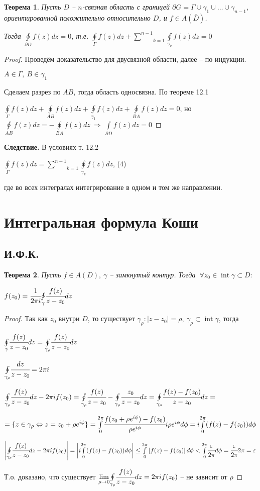 \documentclass[draft]{article}
\newcommand{\dd}{\partial}
\newcommand{\then}{\ \Rightarrow\ }
\newcommand{\mint}[2]{\underset{#1}{\overset{#2}{\int}}}
\newcommand{\moint}[1]{\underset{#1}{\oint}}
\newcommand{\msum}[2]{\underset{#1}{\overset{#2}{\sum}}}
\newcommand{\mlim}[1]{\underset{#1}{\lim}}
\newcommand{\LRA}{\Leftrightarrow}
\renewcommand{\bar}{\overline}
\newcommand{\Int}{\mathop{\mathrm{int}}\nolimits}
\newcommand{\g}{\gamma}
\newcommand{\G}{\Gamma}
\renewcommand{\f}{\phi}
\newcommand{\F}{\ \forall}
\newtheorem*{theor}{Теорема}
\theoremstyle{remark}
\begin{document}
\begin{theor}
Пусть $D$ -- $n$-связная область с границей $\dd G=\G\cup\g_1\cup\ldots\cup\g_{n-1}$, ориентированной положительно относительно $D$, и $f\in A(\bar{D})$. 

Тогда $\moint{\dd D}f(z)dz=0$, т.е. $\moint{\G}f(z)dz+\msum{k=1}{n-1}\moint{\g_k}f(z)dz=0$
\end{theor}
\begin{proof}
Проведём доказательство для двусвязной области, далее -- по индукции.

$A\in\G,\ B\in\g_1$

Сделаем разрез по $AB$, тогда область односвязна. По теореме 12.1

$\moint{\G}f(z)dz+\moint{AB}f(z)dz+\moint{\g_1}f(z)dz+\moint{BA}f(z)dz=0$, но $\moint{AB}f(z)dz=-\moint{BA}f(z)dz\then\mint{\dd D}{}f(z)dz=0$
\end{proof}

{\bfseries Следствие.}
В условиях т. 12.2

$\moint{\G}f(z)dz=\msum{k=1}{n-1}\moint{\g_k}f(z)dz$, (4)

где во всех интегралах интегрирование в одном и том же направлении.

\newpage

\section{Интегральная формула Коши}

\subsection{И.Ф.К.}

\begin{theor}
Пусть $f\in A(D),\ \g$ -- замкнутый контур. Тогда $\F z_0\in\Int\g\subset D:$

$f(z_0)=\cfrac{1}{2\pi i}\moint{\g}\cfrac{f(z)}{z-z_0}dz$
\end{theor}
\begin{proof}
Так как $z_0$ внутри $D$, то существует $\g_\rho\colon|z-z_0|=\rho,\ \g_\rho\subset\Int\g$, тогда

$\moint{\g}\cfrac{f(z)}{z-z_0}dz=\moint{\g_\rho}\cfrac{f(z)}{z-z_0}dz$

$\moint{\g_\rho}\cfrac{dz}{z-z_0}=2\pi i$

$\moint{\g_\rho}\cfrac{f(z)}{z-z_0}dz-2\pi if(z_0)=\moint{\g_\rho}\cfrac{f(z)}{z-z_0}-\moint{\g_\rho}\cfrac{z_0}{z-z_0}dz=\moint{\g_\rho}\cfrac{f(z)-f(z_0)}{z-z_0}dz=$

$=\{z\in\g_\rho \LRA z=z_0+\rho e^{i\f}\}=\mint{0}{2\pi}\cfrac{f(z_0+\rho e^{i\f})-f(z_0)}{\rho e^{i\f}}i\rho e^{i\f}d\f=i\mint{0}{2\pi}(f(z)-f(z_0))d\f$

$\left|\moint{\g_\rho}\cfrac{f(z)}{z-z_0}dz-2\pi if(z_0)\right|=\left|i\mint{0}{2\pi}(f(z)-f(z_0))d\f\right|\leq\mint{0}{2\pi}\left|f(z)-f(z_0)\right|d\f<\mint{0}{2\pi}\cfrac{\varepsilon}{2\pi}d\f=\cfrac{\varepsilon}{2\pi}2\pi=\varepsilon$

Т.о. доказано, что существует $\mlim{\rho\to0}\moint{\g_\rho}\cfrac{f(z)}{z-z_0}dz=2\pi if(z_0)$ -- не зависит от $\rho$
\end{proof}
\end{document}
